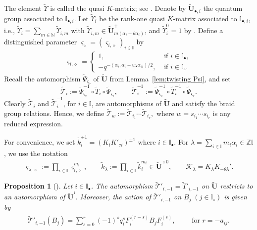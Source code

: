 \documentclass[a4paper,reqno,12pt]{amsart}
\numberwithin{equation}{section}
\newtheorem{proposition}{Proposition}[section]
\theoremstyle{definition}
\theoremstyle{plain}
\theoremstyle{definition}
\def\N{\mathbb N}
\def\Z{\mathbb Z}
\def\I{\mathbb I}
\def\bI{\I_\bullet}
\def\wI{\I_\circ}
\def\bw{w_\bullet}
\def\tU{\widetilde{\mathbf U}}
\def\tUi{\widetilde{\mathbf U}^{\imath}}
\def\tTD{\widetilde T}
\def\tT{\widetilde{\mathscr T}}
\def\tk{\widetilde k}
\def\cK{\mathcal K}
\def\vs{\varsigma}
\def\bvs{\boldsymbol\varsigma}
\def\dm{\diamond}
\def \bvs{{\boldsymbol{\varsigma}}}
\begin{document}
The element $\widetilde{\Upsilon}$ is called the quasi $K$-matrix; see \cite{BW18b,BK19,AV22}.
Denote by $\tU_{\bullet,i}$ the quantum group associated to $ \I_{\bullet,i}$. Let $\widetilde{\Upsilon}_i$ be the rank-one quasi $K$-matrix associated to $ \I_{\bullet,i}$, i.e., $\widetilde{\Upsilon}_i=\sum_{m\in \N}\widetilde{\Upsilon}_{i,m}$ with $\widetilde{\Upsilon}_{i,m}\in\tU_{m(\alpha_i-\theta\alpha_i)}^+$, and $\widetilde{\Upsilon}_{i}^{0}=1$ by \cite[Remark 3.10]{WZ23}. Define a distinguished parameter $\bvs_\diamond=(\varsigma_{i,\diamond})_{i\in\I}$ by
\begin{align}
		\label{eq:disting-para}
		\varsigma_{i,\diamond}= \left\{
		\begin{array}{ll}
			1, & \text{ if } i\in\bI,
			\\
			- q^{-(\alpha_i , \alpha_i+\bw\alpha_{\tau i})/2}, & \text{ if } i\in\wI.
		\end{array}
		\right.
	\end{align}
    Recall the automorphism $\widetilde{\Psi}_{\varsigma_{\diamond}}$ of $\tU$ from Lemma~\ref{lem:twisting Psi}, and set
	\begin{equation}\label{eq: T_i twisted def}
		\tT_i:=\widetilde{\Psi}_{\bvs_\diamond}^{-1}\circ\tTD_i\circ \widetilde{\Psi}_{\bvs_\diamond},
		\qquad \tT_i^{-1}:=\widetilde{\Psi}_{\bvs_\diamond}^{-1}\circ\tTD_i^{-1}\circ \widetilde{\Psi}_{\bvs_\diamond}.
	\end{equation}
	Clearly $\tT_i$ and $\tT_i^{-1}$, for $i\in\I$, are automorphisms of $\tU$ and satisfy the braid group relations. Hence, we define
	$\tT_w:=\tT_{i_1}\cdots \tT_{i_r},$
	where $w=s_{i_1}\cdots s_{i_r}$ is any reduced expression.

    For convenience, we set $\tk_i^{\pm1}=(K_i K'_{\tau i})^{\pm1}$ where $i\in\bI$.
For $\lambda=\sum_{i\in \I} m_i \alpha_i \in \Z\I$, we use the notation
\begin{align}
  \label{eq:vkHla}
\vs_{\lambda,\dm}:=\prod_{i\in \I}\vs_{i,\dm}^{m_i},\qquad
\tk_{\lambda}:=\prod_{i\in \I}\tk_{i}^{m_i}  \in \tU^{\imath 0},\qquad
\cK_\lambda=K_\lambda K_{-\theta\lambda}'.
\end{align}

\begin{proposition}[]
  \label{prop:Tjblack}
Let $i\in \bI$. The automorphism $\tT'_{i,-1} =\tTD'_{i,-1}$ on $\tU$ restricts to an automorphism of $\tUi$. Moreover, the action of $\tT'_{i,-1}$ on $B_j \; (j\in \wI)$ is given by
\begin{align}\label{eq:newb-1}
\begin{split}
\tT'_{i,-1}(B_j)=\sum_{s=0}^r (-1)^s q_i^s F_i^{(r-s)} B_j F_i^{(s)},\qquad \text{ for } r=-a_{ij}.
\end{split}
\end{align}
\end{proposition}
\end{document}
